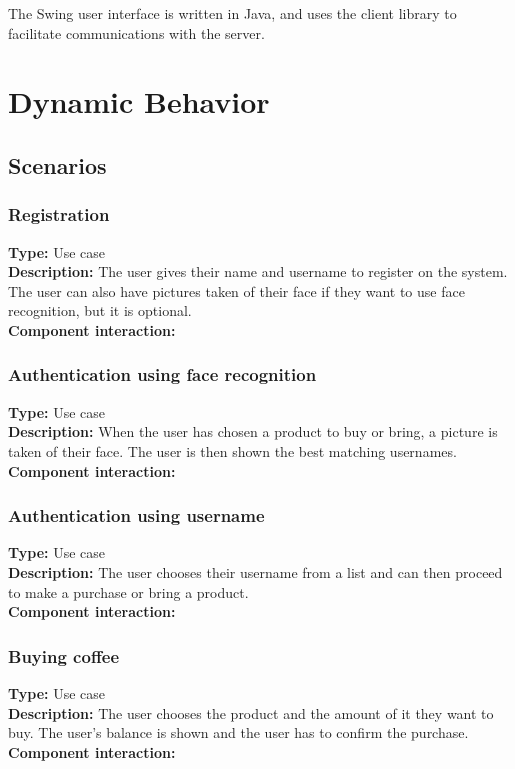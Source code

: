 \documentclass[11pt]{article}
\begin{document}
The Swing user interface is written in Java, and uses the client
library to facilitate communications with the server.


\section{Dynamic Behavior}
\subsection{Scenarios}

\subsubsection{Registration}
\textbf{Type:} Use case\\
\textbf{Description:} The user gives their name and username to register on the system. The user can also have pictures taken of their face if they want to use face recognition, but it is optional.\\
\textbf{Component interaction:} \\
   
\subsubsection{Authentication using face recognition}
\textbf{Type:} Use case\\
\textbf{Description:} When the user has chosen a product to buy or bring, a picture is taken of their face. The user is then shown the best matching usernames.\\
\textbf{Component interaction:} \\
   
\subsubsection{Authentication using username}
\textbf{Type:} Use case\\
\textbf{Description:} The user chooses their username from a list and can then proceed to make a purchase or bring a product.\\
\textbf{Component interaction:}\\

\subsubsection{Buying coffee}
\textbf{Type:} Use case\\
\textbf{Description:} The user chooses the product and the amount of it they want to buy. The user's balance is shown and the user has to confirm the purchase.\\
\textbf{Component interaction:}\\
\end{document}
